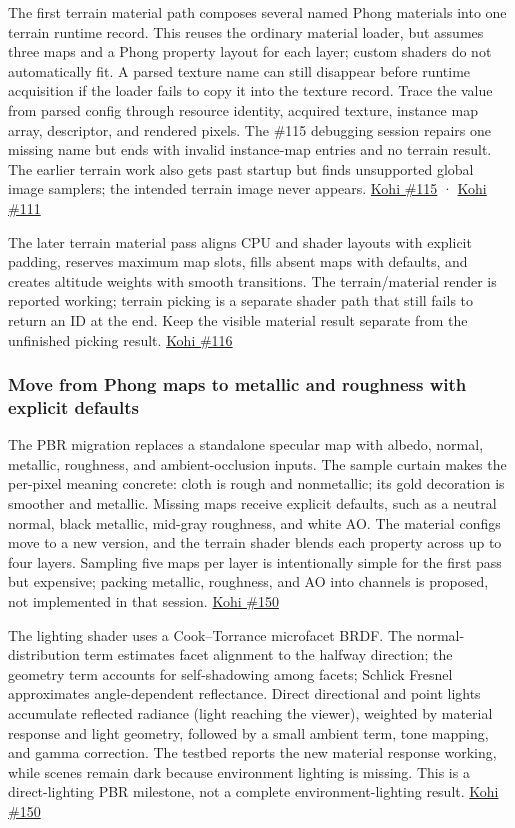 The first terrain material path composes several named Phong materials into one terrain runtime record. This reuses the ordinary material loader, but assumes three maps and a Phong property layout for each layer; custom shaders do not automatically fit. A parsed texture name can still disappear before runtime acquisition if the loader fails to copy it into the texture record. Trace the value from parsed config through resource identity, acquired texture, instance map array, descriptor, and rendered pixels. The \#115 debugging session repairs one missing name but ends with invalid instance-map entries and no terrain result. The earlier terrain work also gets past startup but finds unsupported global image samplers; the intended terrain image never appears. \href{https://www.youtube.com/watch?v=IaFdiRqQ-jw}{Kohi \#115} · \href{https://www.youtube.com/watch?v=J7qBRwaPxv8}{Kohi \#111}

The later terrain material pass aligns CPU and shader layouts with explicit padding, reserves maximum map slots, fills absent maps with defaults, and creates altitude weights with smooth transitions. The terrain/material render is reported working; terrain picking is a separate shader path that still fails to return an ID at the end. Keep the visible material result separate from the unfinished picking result. \href{https://www.youtube.com/watch?v=b_L8RSQlu48}{Kohi \#116}

\subsubsection{Move from Phong maps to metallic and roughness with explicit defaults}\label{move-from-phong-maps-to-metallic-and-roughness-with-explicit-defaults}

The PBR migration replaces a standalone specular map with albedo, normal, metallic, roughness, and ambient-occlusion inputs. The sample curtain makes the per-pixel meaning concrete: cloth is rough and nonmetallic; its gold decoration is smoother and metallic. Missing maps receive explicit defaults, such as a neutral normal, black metallic, mid-gray roughness, and white AO. The material configs move to a new version, and the terrain shader blends each property across up to four layers. Sampling five maps per layer is intentionally simple for the first pass but expensive; packing metallic, roughness, and AO into channels is proposed, not implemented in that session. \href{https://www.youtube.com/watch?v=SNdjjeRAFc4}{Kohi \#150}

The lighting shader uses a Cook--Torrance microfacet BRDF. The normal-distribution term estimates facet alignment to the halfway direction; the geometry term accounts for self-shadowing among facets; Schlick Fresnel approximates angle-dependent reflectance. Direct directional and point lights accumulate reflected radiance (light reaching the viewer), weighted by material response and light geometry, followed by a small ambient term, tone mapping, and gamma correction. The testbed reports the new material response working, while scenes remain dark because environment lighting is missing. This is a direct-lighting PBR milestone, not a complete environment-lighting result. \href{https://www.youtube.com/watch?v=SNdjjeRAFc4}{Kohi \#150}

